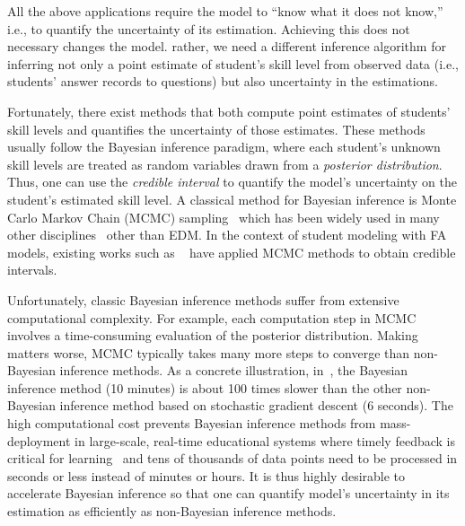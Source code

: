 \documentclass{edm_article}
\begin{document}
All the above applications require the model to ``know what it does not know,'' i.e., to quantify the uncertainty of its estimation. Achieving this does not necessary changes the model. rather, we need a different inference algorithm for inferring not only a point estimate of student's skill level from observed data (i.e., students' answer records to questions) but also uncertainty in the estimations. 

Fortunately, there exist methods that both compute point estimates of students' skill levels and quantifies the uncertainty of those estimates. These methods usually follow the Bayesian inference paradigm, where each student's unknown skill levels are treated as random variables drawn from a \textit{posterior distribution}. Thus, one can use the \textit{credible interval} to quantify the model's uncertainty on the student's estimated skill level. A classical method for Bayesian inference is Monte Carlo Markov Chain (MCMC) sampling~\cite{gelman2013bayesian} which has been widely used in many other disciplines~\cite{gilks1995markov} other than EDM. In the context of student modeling with FA models, existing works such as ~\cite{lan14a,fox2010bayesian,pardos2010using,merkle2011comparison} have applied MCMC methods to obtain credible intervals. 

Unfortunately, classic Bayesian inference methods suffer from extensive computational complexity. For example, each computation step in MCMC involves a time-consuming evaluation of the posterior distribution. Making matters worse, MCMC typically takes many more steps to converge than non-Bayesian inference methods. As a concrete illustration, in~\cite{lan14a}, the Bayesian inference method (10 minutes) is about 100 times slower than the other non-Bayesian inference method based on stochastic gradient descent (6 seconds). The high computational cost prevents Bayesian inference methods from mass-deployment in large-scale, real-time educational systems where timely feedback is critical for learning~\cite{driscoll1994psychology} and tens of thousands of data points need to be processed in seconds or less instead of minutes or hours.
It is thus highly desirable to accelerate Bayesian inference so that one can quantify model's uncertainty in its estimation as efficiently as non-Bayesian inference methods.
\end{document}
